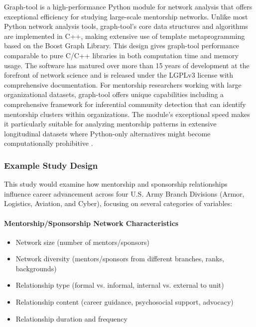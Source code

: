 \documentclass[main.tex]{subfiles}
\begin{document}
Graph-tool is a high-performance Python module for network analysis that offers exceptional efficiency for studying large-scale mentorship networks. Unlike most Python network analysis tools, graph-tool's core data structures and algorithms are implemented in C++, making extensive use of template metaprogramming based on the Boost Graph Library. This design gives graph-tool performance comparable to pure C/C++ libraries in both computation time and memory usage. The software has matured over more than 15 years of development at the forefront of network science and is released under the LGPLv3 license with comprehensive documentation. For mentorship researchers working with large organizational datasets, graph-tool offers unique capabilities including a comprehensive framework for inferential community detection that can identify mentorship clusters within organizations. The module's exceptional speed makes it particularly suitable for analyzing mentorship patterns in extensive longitudinal datasets where Python-only alternatives might become computationally prohibitive \cite{graphtool2023python}.

\subsubsection{Example Study Design}


This study would examine how mentorship and sponsorship relationships influence career advancement across four U.S. Army Branch Divisions (Armor, Logistics, Aviation, and Cyber), focusing on several categories of variables:

\paragraph{Mentorship/Sponsorship Network Characteristics}
\begin{itemize}
\item Network size (number of mentors/sponsors)
\item Network diversity (mentors/sponsors from different branches, ranks, backgrounds)
\item Relationship type (formal vs. informal, internal vs. external to unit)
\item Relationship content (career guidance, psychosocial support, advocacy)
\item Relationship duration and frequency
\end{itemize}
\end{document}
